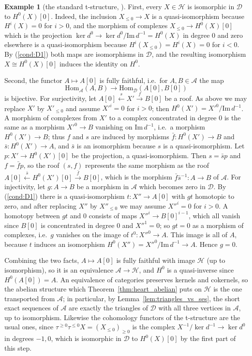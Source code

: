 \documentclass[12pt]{amsart}
\newcommand{\condref}[1]{\textup{(\ref{#1})}}
\numberwithin{theorem}{section}
\theoremstyle{definition}
\newtheorem{example}[theorem]{Example}
\newcommand{\calA}{\mathcal{A}}
\newcommand{\Hom}{\mathrm{Hom}}
\newcommand{\image}{\mathrm{Im} \,}
\newcommand{\calD}{\mathcal{D}}
\newcommand{\calH}{\mathcal{H}}
\begin{document}
\begin{example}[the standard t-structure, {\cite[Exemple~1.3.2]{BBD82}}]
		First, every $X \in \calH$ is isomorphic in $\calD$ to $H^0(X)[0]$.
		Indeed, the inclusion $X_{\leqslant 0} \to X$ is a quasi-isomorphism because $H^i(X) = 0$ for $i > 0$, and the morphism of complexes $X_{\leqslant 0} \to H^0(X)[0]$ which is the projection $\ker d^0 \to \ker d^0 / \image d^{-1} = H^0(X)$ in degree $0$ and zero elsewhere is a quasi-isomorphism because $H^i(X_{\leqslant 0}) = H^i(X) = 0$ for $i < 0$.
		By \condref{cond:D1} both maps are isomorphisms in $\calD$, and the resulting isomorphism $X \cong H^0(X)[0]$ induces the identity on $H^0$.
		
		Second, the functor $A \mapsto A[0]$ is fully faithful, i.e.\ for $A, B \in \calA$ the map
		\[
		\Hom_{\calA}(A, B) \longrightarrow \Hom_{\calD}(A[0], B[0])
		\]
		is bijective.
		For surjectivity, let $A[0] \xleftarrow{s} X' \xrightarrow{f} B[0]$ be a roof.
		As above we may replace $X'$ by $X'_{\leqslant 0}$ and assume $X'^i = 0$ for $i > 0$; then $H^0(X') = X'^0 / \image d^{-1}$.
		A morphism of complexes from $X'$ to a complex concentrated in degree $0$ is the same as a morphism $X'^0 \to B$ vanishing on $\image d^{-1}$, i.e.\ a morphism $H^0(X') \to B$;
		thus $f$ and $s$ are induced by morphisms $\bar f \colon H^0(X') \to B$ and $\bar s \colon H^0(X') \to A$, and $\bar s$ is an isomorphism because $s$ is a quasi-isomorphism.
		Let $p \colon X' \to H^0(X')[0]$ be the projection, a quasi-isomorphism.
		Then $s = \bar s p$ and $f = \bar f p$, so the roof $(s, f)$ represents the same morphism as the roof $A[0] \xleftarrow{\bar s} H^0(X')[0] \xrightarrow{\bar f} B[0]$, which is the morphism $\bar f \bar s^{-1} \colon A \to B$ of $\calA$.
		For injectivity, let $g \colon A \to B$ be a morphism in $\calA$ which becomes zero in $\calD$.
		By \condref{cond:D1} there is a quasi-isomorphism $t \colon X'' \to A[0]$ with $g t$ homotopic to zero, and after replacing $X''$ by $X''_{\leqslant 0}$ we may assume $X''^i = 0$ for $i > 0$.
		A homotopy between $g t$ and $0$ consists of maps $X''^{i} \to B[0]^{i-1}$, which all vanish since $B[0]$ is concentrated in degree $0$ and $X''^{1} = 0$;
		so $g t = 0$ as a morphism of complexes, i.e.\ $g$ vanishes on the image of $t^0 \colon X''^0 \to A$.
		This image is all of $A$, because $t$ induces an isomorphism $H^0(X'') = X''^0 / \image d^{-1} \to A$.
		Hence $g = 0$.
		
		Combining the two facts, $A \mapsto A[0]$ is fully faithful with image $\calH$ (up to isomorphism), so it is an equivalence $\calA \to \calH$, and $H^0$ is a quasi-inverse since $H^0(A[0]) = A$.
		An equivalence of categories preserves kernels and cokernels, so the abelian structure which Theorem~\ref{thm:heart_abelian} puts on $\calH$ is the one transported from $\calA$;
		in particular, by Lemma~\ref{lem:triangles_vs_ses}, the short exact sequences of $\calA$ are exactly the triangles of $\calD$ with all three vertices in $\calA$, up to isomorphism.
		Likewise the cohomology functors of the t-structure are the usual ones, since $\tau^{\geqslant 0} \tau^{\leqslant 0} X = (X_{\leqslant 0})_{\geqslant 0}$ is the complex $X^{-1} / \ker d^{-1} \to \ker d^0$ in degrees $-1, 0$, which is isomorphic in $\calD$ to $H^0(X)[0]$ by the first part of this step.
		

\end{example}
\end{document}
